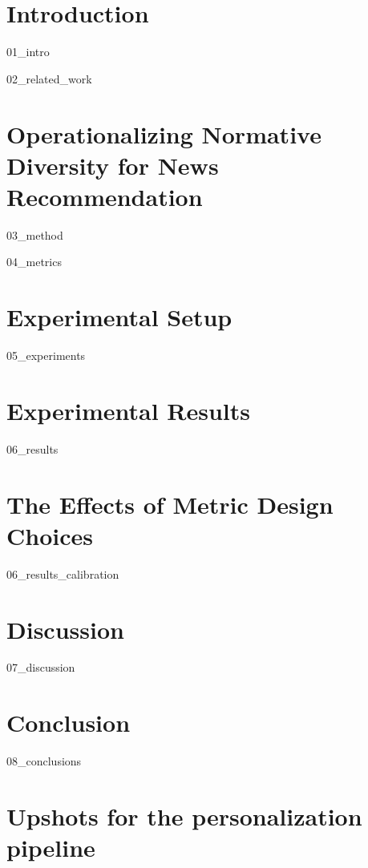 \section{Introduction}
{01_intro}
\label{sec:introduction}

{02_related_work}

\section{Operationalizing Normative Diversity for News Recommendation}
\label{sec:method}
{03_method}

\label{sec:metrics_implementation}
{04_metrics}

\section{Experimental Setup} 
\label{sec:experiments}
{05_experiments}

\section{Experimental Results} 
\label{sec:results}
{06_results}

\section{The Effects of Metric Design Choices}
{06_results_calibration}

\section{Discussion}
\label{sec:discussion}
{07_discussion}

\section{Conclusion}
\label{sec:conclusions}
{08_conclusions}



\section{Upshots for the personalization pipeline}

